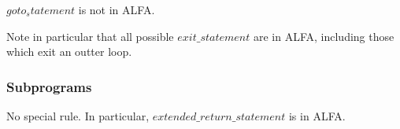 \documentclass{article}
\newcommand{\bnf}[1]{$\mathit{#1}$}
\begin{document}
\noindent
\bnf{goto_statement} is not in ALFA.

Note in particular that all possible \bnf{exit\_statement} are in ALFA,
including those which exit an outter loop.

\subsubsection{Subprograms}

No special rule. In particular, \bnf{extended\_return\_statement} is in ALFA.






\end{document}
